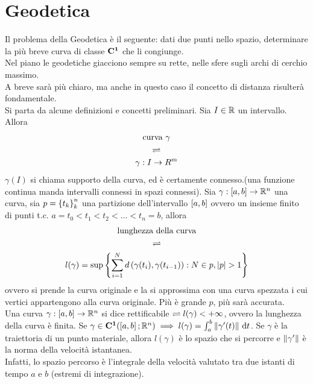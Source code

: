 \section{Geodetica}
Il problema della Geodetica è il seguente: dati due punti nello spazio, determinare la più breve curva di classe $ \mathbf{C^{1}} $ che li congiunge.\\
Nel piano le geodetiche giacciono sempre su rette, nelle sfere sugli archi di cerchio massimo.\\
A breve sarà più chiaro, ma anche in questo caso il concetto di distanza risulterà fondamentale.\\
Si parta da alcune definizioni e concetti preliminari.
Sia $ I \in \mathbb{R} $ un intervallo. Allora
\[
	\begin{gathered}
		\text{curva } \gamma\\
		\rightleftharpoons\\
		\gamma: I \to R^m
	\end{gathered}
\]
\observation
$\gamma(I)$ si chiama supporto della curva, ed è certamente connesso.(una funzione continua manda intervalli connessi in spazi connessi).
Sia $\gamma : \left[a,b\right] \to \mathbb{R}^n$ una curva, sia $ p = \left\{ t_k \right\}_k^n $ una partizione dell'intervallo $ \left[a,b\right] $
ovvero un insieme finito di punti t.c. $ a = t_0 < t_1 < t_2 < \ldots < t_n = b $, allora
\[
	\begin{gathered}
		\text{lunghezza della curva}\\
		\bydef\\
		l(\gamma)=\sup\brackets{\sum\limits_{i=1}^{N}d\left(\gamma(t_i), \gamma(t_{i-1})\right): N \in p,|p|>1}
	\end{gathered}
\]
ovvero si prende la curva originale e la si approssima con una curva spezzata i cui vertici appartengono alla curva originale.
Più è grande $ p $, più sarà accurata.\\
Una curva $\gamma : \left[a,b\right] \to \mathbb{R}^n$ si dice rettificabile $\rightleftharpoons l(\gamma)<+\infty$, ovvero la lunghezza della curva è finita.
\proposition
\label{prop:lunghezza_curva_integrale}
Se $\gamma\in \mathbf{C^{1}}(\left[a,b\right]; \mathbb{R} ^n)\implies l(\gamma)=\int_a^b\left\|\gamma'(t)\right\|\,\mathrm{d}{t}$.
\observation
Se $\gamma$ è la traiettoria di un punto materiale, allora $l(\gamma)$ è lo spazio che si percorre e $\left\|\gamma'\right\|$ è la norma della velocità istantanea.\\
Infatti, lo spazio percorso è l'integrale della velocità valutato tra due istanti di tempo $a$ e $b$ (estremi di integrazione).
